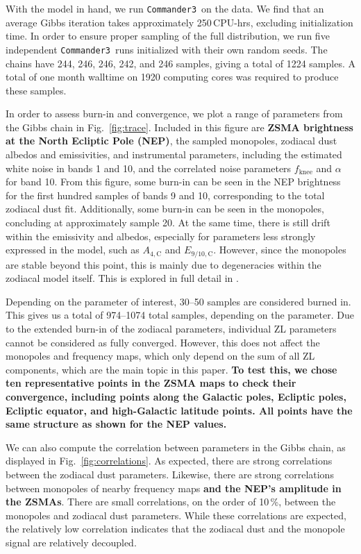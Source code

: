 \documentclass{aa}
\def\commanderthree{\texttt{Commander3}}
\begin{document}
With the model in hand, we run \commanderthree\ on the data. We find that an average Gibbs iteration takes approximately 250\,CPU-hrs, excluding initialization time. In order to ensure proper sampling of the full distribution, we run {five} independent \commanderthree\ runs initialized with their own random seeds. {The chains have 244, 246, 246, 242, and 246} samples, giving a total of {1224} samples. A total of one month walltime on 1920 computing cores was required to produce these samples.

In order to assess burn-in and convergence, we plot a range of parameters from the Gibbs chain in Fig.~\ref{fig:trace}. Included in this figure are \textbf{ZSMA brightness at the North Ecliptic Pole (NEP)}, the sampled monopoles, zodiacal dust albedos and emissivities, and instrumental parameters, including the estimated white noise in bands 1 and 10, and the correlated noise parameters $f_\mathrm{knee}$ and $\alpha$ for band 10. From this figure, {some burn-in can be seen in the NEP brightness for the first hundred samples of bands 9 and 10, corresponding to the total zodiacal dust fit. Additionally,} some burn-in can be seen in the monopoles, concluding at approximately sample 20.  At the same time, there is still drift within the emissivity and albedos, especially for parameters less strongly expressed in the model, such as $A_{4,\mathrm C}$ and $E_{9/10,\mathrm C}$. However, since the monopoles are stable beyond this point, this is mainly due to degeneracies within the zodiacal model itself. This is explored in full detail in \citet{CG02_02}.

{Depending on the parameter of interest, 30--50 samples are considered burned in. This gives us a total of 974--1074 total samples, depending on the parameter.}
 Due to the extended burn-in of the zodiacal parameters, individual ZL parameters cannot be considered as fully converged. However, this does not affect the monopoles and frequency maps, which only depend on the sum of all ZL components, which are the main topic in this paper. \textbf{To test this, we chose ten representative points in the ZSMA maps to check their convergence, including points along the Galactic poles, Ecliptic poles, Ecliptic equator, and high-Galactic latitude points. All points have the same structure as shown for the NEP values.}

We can also compute the correlation between parameters in the Gibbs chain, as displayed in Fig.~\ref{fig:correlations}.  As expected, there are strong correlations between the zodiacal dust parameters. Likewise, there are strong correlations between monopoles of nearby frequency maps \textbf{and the NEP's amplitude in the ZSMAs}. There are small correlations, on the order of 10\,\%, between the monopoles and zodiacal dust parameters. While these correlations are expected, the relatively low correlation indicates that the zodiacal dust and the monopole signal are relatively decoupled.
\end{document}
